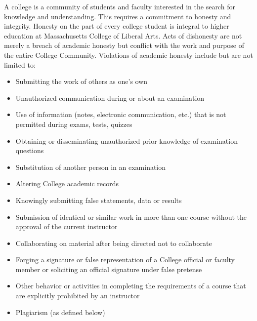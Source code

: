 \documentclass[letterpaper,10pt]{article}
\begin{document}
A college is a community of students and faculty interested in the search for knowledge and understanding. This requires a commitment to honesty and integrity. Honesty on the part of every college student is integral to higher education at Massachusetts College of Liberal Arts. Acts of dishonesty are not merely a breach of academic honesty but conflict with the work and purpose of the entire College Community. Violations of academic honesty include but are not limited to:
\begin{itemize}
\item Submitting the work of others as one's own
\item Unauthorized communication during or about an examination
\item Use of information (notes, electronic communication, etc.) that is not permitted during exams,
tests, quizzes
\item Obtaining or disseminating unauthorized prior knowledge of examination questions
\item Substitution of another person in an examination
\item Altering College academic records
\item Knowingly submitting false statements, data or results
\item Submission of identical or similar work in more than one course without the approval of the
current instructor
\item Collaborating on material after being directed not to collaborate
\item Forging a signature or false representation of a College official or faculty member or soliciting an
official signature under false pretense
\item Other behavior or activities in completing the requirements of a course that are explicitly
prohibited by an instructor
\item Plagiarism (as defined below)
\end{itemize}
\end{document}
